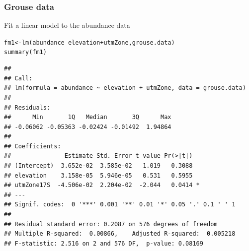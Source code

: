 \documentclass[color=usenames,dvipsnames]{beamer}\usepackage[]{graphicx}\usepackage[]{color}
\makeatletter
\newcommand{\hlopt}[1]{\textcolor[rgb]{0,0,0}{#1}}%
\newcommand{\hlstd}[1]{\textcolor[rgb]{0,0,0}{#1}}%
\newcommand{\hlkwb}[1]{\textcolor[rgb]{0,0.341,0.682}{#1}}%
\newcommand{\hlkwd}[1]{\textcolor[rgb]{0.004,0.004,0.506}{#1}}%
\newenvironment{kframe}{%
 \def\at@end@of@kframe{}%
 \ifinner\ifhmode%
  \def\at@end@of@kframe{\end{minipage}}%
  \begin{minipage}{\columnwidth}%
 \fi\fi%
 \def\FrameCommand##1{\hskip\@totalleftmargin \hskip-\fboxsep
 \colorbox{shadecolor}{##1}\hskip-\fboxsep
     \hskip-\linewidth \hskip-\@totalleftmargin \hskip\columnwidth}%
 \MakeFramed {\advance\hsize-\width
   \@totalleftmargin\z@ \linewidth\hsize
   \@setminipage}}%
 {\par\unskip\endMakeFramed%
 \at@end@of@kframe}
\newenvironment{knitrout}{}{} %
\makeatother
\begin{document}
\begin{frame}[fragile]
  \frametitle{Grouse data}
  Fit a linear model to the abundance data
\begin{knitrout}\scriptsize
{}\color{fgcolor}\begin{kframe}
\begin{alltt}
\hlstd{fm1} \hlkwb{<-} \hlkwd{lm}\hlstd{(abundance} \hlopt{~} \hlstd{elevation} \hlopt{+} \hlstd{utmZone, grouse.data)}
\hlkwd{summary}\hlstd{(fm1)}
\end{alltt}
\begin{verbatim}
## 
## Call:
## lm(formula = abundance ~ elevation + utmZone, data = grouse.data)
## 
## Residuals:
##      Min       1Q   Median       3Q      Max 
## -0.06062 -0.05363 -0.02424 -0.01492  1.94864 
## 
## Coefficients:
##               Estimate Std. Error t value Pr(>|t|)  
## (Intercept)  3.652e-02  3.585e-02   1.019   0.3088  
## elevation    3.158e-05  5.946e-05   0.531   0.5955  
## utmZone17S  -4.506e-02  2.204e-02  -2.044   0.0414 *
## ---
## Signif. codes:  0 '***' 0.001 '**' 0.01 '*' 0.05 '.' 0.1 ' ' 1
## 
## Residual standard error: 0.2087 on 576 degrees of freedom
## Multiple R-squared:  0.00866,	Adjusted R-squared:  0.005218 
## F-statistic: 2.516 on 2 and 576 DF,  p-value: 0.08169
\end{verbatim}
\end{kframe}
\end{knitrout}
\end{frame}
\end{document}
